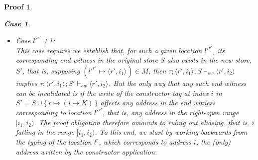 \documentclass[showabstract,showacknowledgments,showpreface,showdedication,school]{iuphd}
\newtheorem*{bcase}{Case}
\theoremstyle{nonumberplain}
\newtheorem{nproof}{Proof}
\newcommand{\keywd}[1]{\mathit{#1}}
\newcommand{\skeywd}[1]{\mathit{#1}}
\newcommand{\DC}{\keywd{K}}
\newcommand{\TYP}{\keywd{\tau}}
\newcommand{\loc}{\skeywd{l}}
\newcommand{\concreteloc}[3]{\ensuremath{\langle #1, #2 \rangle ^{#3}}}
\newcommand{\reg}{\skeywd{r}}
\newcommand{\ind}{\keywd{i}}
\newcommand{\indj}{\keywd{j}}
\newcommand{\STOR}{\keywd{S}}
\newcommand\set[1]{\{ \, \ensuremath{#1} \,\}}
\newcommand{\MENV}{\keywd{M}}
\newcommand{\locreg}[2]{\ensuremath{{#1}^{#2}}}
\newcommand{\ewitness}[4]{\ensuremath{#1;#2;#3 \vdash_{ew} #4}}
\newcommand{\overharpoon}[1]{\overrightharpoon{#1}}
\begin{document}
\begin{nproof}
\begin{bcase}
\begin{itemize}
\begin{itemize}
\begin{itemize}
\begin{align*}
           \end{align*}
           exist.
           We obtain the needed result for the remaining end witnesses
           by instantiating for $\overharpoon{w}$, yielding
           \begin{align}
           \ewitness{\overharpoon{\TYP_{\indj''+1}'}}{\concreteloc{\reg}{\overharpoon{w_{\indj''}}}{}}{\STOR}{\concreteloc{\reg}{\overharpoon{w_{\indj'' + 1}}}{}} \label{prf:dc-ew-f2}.
           \end{align}
           The original end witness required by~\ref{prf:dc-cj2} is now established by letting
           $\ind_1 = \ind$ and $\ind_2 = \overharpoon{w_{n+1}}$.

           Finally, to discharge this case, the end witnesses of the constructor
           arguments established in lines~\ref{prf:dc-ew-f1} and~\ref{prf:dc-ew-f2}
           need to hold for the new store
           $\STOR' = \STOR \cup \set{\reg \mapsto (\ind \mapsto \DC)}$.
           To this end, in $\STOR'$, the newly
           written tag at address $\ind$ cannot overlap with the cells
           occupied by any of the constructor arguments.
           Therefore, the desired end witnesses exist in $\STOR'$, thereby
           discharging this case.
      \item Case $\locreg{\loc'}{\reg'} \neq \loc$: \\
      This case requires we establish that, for such a given location $\locreg{\loc'}{\reg'}$, its
      corresponding end witness in the original store $\STOR$ also exists
      in the new store, $\STOR'$, that is, supposing $(\locreg{\loc'}{\reg'} \mapsto \concreteloc{\reg'}{\ind_1}{}) \in \MENV$, then $\ewitness{\TYP}{\concreteloc{\reg'}{\ind_1}{}}{\STOR}{\concreteloc{\reg'}{\ind_2}{}}$ implies $\ewitness{\TYP}{\concreteloc{\reg'}{\ind_1}{}}{\STOR'}{\concreteloc{\reg'}{\ind_2}{}}$.
      But the only way that any such end witness can be invalidated
      is if the write of the constructor tag at index $\ind$ in
      $\STOR' = \STOR \cup \set{\reg \mapsto (\ind \mapsto \DC)}$ affects
      any address in the end witness corresponding
      to location $\locreg{\loc'}{\reg'}$, that is, any address
      in the right-open range $[\ind_1, \ind_2)$.
      The proof obligation therefore amounts to ruling out
      aliasing, that is, $\ind$ falling in the range
      $[\ind_1, \ind_2)$.
      To this end, we start by working backwards from the typing of
      the location $\locreg{\loc}{\reg}$, which corresponds to address $\ind$, the (only) address
      written by the constructor application.

\end{itemize}
\end{itemize}
\end{itemize}
\end{bcase}
\end{nproof}
\end{document}
